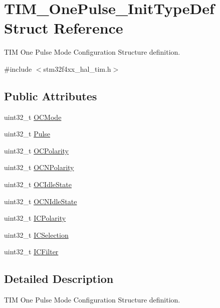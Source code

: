 \hypertarget{struct_t_i_m___one_pulse___init_type_def}{}\section{T\+I\+M\+\_\+\+One\+Pulse\+\_\+\+Init\+Type\+Def Struct Reference}
\label{struct_t_i_m___one_pulse___init_type_def}


T\+IM One Pulse Mode Configuration Structure definition.  




{\ttfamily \#include $<$stm32f4xx\+\_\+hal\+\_\+tim.\+h$>$}

\subsection*{Public Attributes}
\begin{DoxyCompactItemize}
\item 
uint32\+\_\+t \hyperlink{struct_t_i_m___one_pulse___init_type_def_af127f01162853e39ae616b43cc52b674}{O\+C\+Mode}
\item 
uint32\+\_\+t \hyperlink{struct_t_i_m___one_pulse___init_type_def_a4f1fbf6d60812c3194e9ee8a05f5cfa6}{Pulse}
\item 
uint32\+\_\+t \hyperlink{struct_t_i_m___one_pulse___init_type_def_a3028787ad41698072cbf70ddf1b6c984}{O\+C\+Polarity}
\item 
uint32\+\_\+t \hyperlink{struct_t_i_m___one_pulse___init_type_def_a00deac6c3347b0482955d936351c6388}{O\+C\+N\+Polarity}
\item 
uint32\+\_\+t \hyperlink{struct_t_i_m___one_pulse___init_type_def_aef11bcea1dbf3e3ddf2a4bbc2846bb1e}{O\+C\+Idle\+State}
\item 
uint32\+\_\+t \hyperlink{struct_t_i_m___one_pulse___init_type_def_a37bc0a680d53458bf4c42ebb277b0c2c}{O\+C\+N\+Idle\+State}
\item 
uint32\+\_\+t \hyperlink{struct_t_i_m___one_pulse___init_type_def_a8589cf95218ea62604b845054b36b772}{I\+C\+Polarity}
\item 
uint32\+\_\+t \hyperlink{struct_t_i_m___one_pulse___init_type_def_a9e8853f17e85393a869aa2ecb315f030}{I\+C\+Selection}
\item 
uint32\+\_\+t \hyperlink{struct_t_i_m___one_pulse___init_type_def_a883e69dec14d8bde9914906be1b04ad7}{I\+C\+Filter}
\end{DoxyCompactItemize}


\subsection{Detailed Description}
T\+IM One Pulse Mode Configuration Structure definition. 

